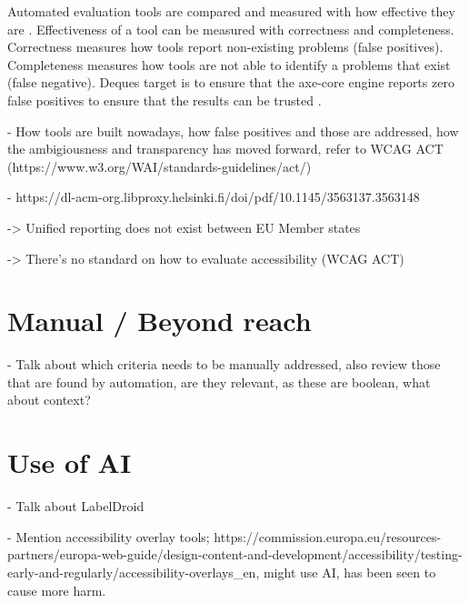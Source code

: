 Automated evaluation tools are compared and measured with how effective they are \citep{Brajnik2004}. Effectiveness of a tool can be measured with correctness and completeness. Correctness measures how tools report non-existing problems (false positives). Completeness measures how tools are not able to identify a problems that exist (false negative). Deques target is to ensure that the axe-core engine reports zero false positives to ensure that the results can be trusted \citep{dequecoverage}. 



- How tools are built nowadays, how false positives and those are addressed, how the ambigiousness and transparency has moved forward, refer to WCAG ACT (https://www.w3.org/WAI/standards-guidelines/act/)



- https://dl-acm-org.libproxy.helsinki.fi/doi/pdf/10.1145/3563137.3563148

-> Unified reporting does not exist between EU Member states

-> There's no standard on how to evaluate accessibility (WCAG ACT)


\section{Manual / Beyond reach}

- Talk about which criteria needs to be manually addressed, also review those that are found by automation, are they relevant, as these are boolean, what about context?

\section{Use of AI}

- Talk about LabelDroid

- Mention accessibility overlay tools; https://commission.europa.eu/resources-partners/europa-web-guide/design-content-and-development/accessibility/testing-early-and-regularly/accessibility-overlays_en, might use AI, has been seen to cause more harm.

